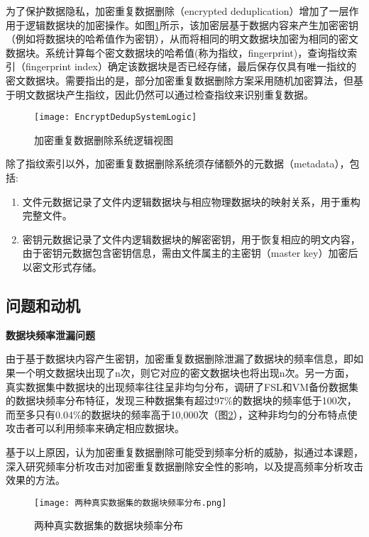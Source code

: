 为了保护数据隐私，加密重复数据删除（encrypted deduplication）增加了一层作用于逻辑数据块的加密操作。如图\ref{fig:加密重复数据删除系统逻辑视图}所示，该加密层基于数据内容来产生加密密钥（例如将数据块的哈希值作为密钥），从而将相同的明文数据块加密为相同的密文数据块。系统计算每个密文数据块的哈希值(称为指纹，fingerprint)，查询指纹索引（fingerprint index）确定该数据块是否已经存储，最后保存仅具有唯一指纹的密文数据块。需要指出的是，部分加密重复数据删除方案采用随机加密算法，但基于明文数据块产生指纹，因此仍然可以通过检查指纹来识别重复数据。

\begin{figure}[!htb]
    \small
    \centering
    \texttt{[image: EncryptDedupSystemLogic]}
    \caption{加密重复数据删除系统逻辑视图}
    \label{fig:加密重复数据删除系统逻辑视图}
\end{figure}

除了指纹索引以外，加密重复数据删除系统须存储额外的元数据（metadata），包括:
\begin{enumerate}
    \item 文件元数据记录了文件内逻辑数据块与相应物理数据块的映射关系，用于重构完整文件。
    \item 密钥元数据记录了文件内逻辑数据块的解密密钥，用于恢复相应的明文内容，由于密钥元数据包含密钥信息，需由文件属主的主密钥（master key）加密后以密文形式存储。
\end{enumerate}

\subsection{问题和动机}

\textbf{数据块频率泄漏问题}

由于基于数据块内容产生密钥，加密重复数据删除泄漏了数据块的频率信息，即如果一个明文数据块出现了n次，则它对应的密文数据块也将出现n次。另一方面，真实数据集中数据块的出现频率往往呈非均匀分布，调研了FSL和VM备份数据集的数据块频率分布特征，发现三种数据集有超过97\%的数据块的频率低于100次，而至多只有0.04\%的数据块的频率高于10,000次（图\ref{fig:两种真实数据集的数据块频率分布}），这种非均匀的分布特点使攻击者可以利用频率来确定相应数据块。

基于以上原因，认为加密重复数据删除可能受到频率分析的威胁，拟通过本课题，深入研究频率分析攻击对加密重复数据删除安全性的影响，以及提高频率分析攻击效果的方法。


\begin{figure}[!htb]
    \small
    \centering
    \texttt{[image: 两种真实数据集的数据块频率分布.png]} %
    \caption{两种真实数据集的数据块频率分布} 
    \label{fig:两种真实数据集的数据块频率分布}
\end{figure}

